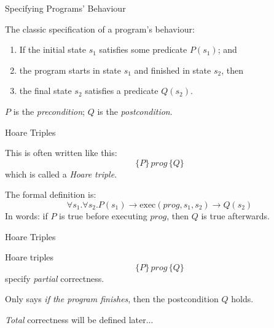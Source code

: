 \documentclass[xetex,aspectratio=169,14pt,hyperref={pdfpagelabels=true,pdflang={en-GB}}]{beamer}
\begin{document}

\begin{frame}
  {Specifying Programs' Behaviour}

  The classic specification of a program's behaviour:

  \bigskip

  \begin{enumerate}
  \item If the initial state $s_1$ satisfies some predicate $P(s_1)$; and
  \item the program starts in state $s_1$ and finished in state $s_2$, then
  \item the final state $s_2$ satisfies a predicate $Q(s_2)$.
  \end{enumerate}

  \bigskip

  $P$ is the \emph{precondition}; $Q$ is the \emph{postcondition}.
\end{frame}

\begin{frame}
  {Hoare Triples}

  This is often written like this:
  \begin{displaymath}
    \{ P \}\, \mathit{prog}\, \{ Q \}
  \end{displaymath}
  which is called a \emph{Hoare triple}.

  \bigskip

  The formal definition is:
  \begin{displaymath}
    \forall s_1. \forall s_2. P(s_1) \to \mathrm{exec}(\mathit{prog},s_1,s_2) \to Q(s_2)
  \end{displaymath}
  In words: if $P$ is true before executing $\mathit{prog}$, then $Q$ is true afterwards.
\end{frame}

\begin{frame}
  {Hoare Triples}

  Hoare triples
  \begin{displaymath}
    \{ P \}\, \mathit{prog}\, \{ Q \}
  \end{displaymath}
  specify \emph{partial} correctness.

  \bigskip

  Only says \emph{if the program finishes}, then the postcondition $Q$ holds.

  \bigskip

  \emph{Total} correctness will be defined later...
\end{frame}
\end{document}
